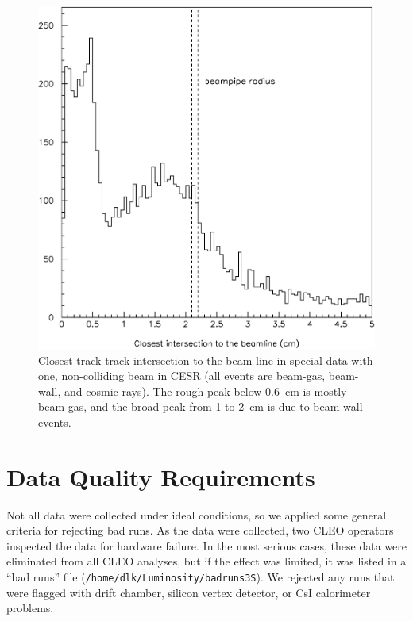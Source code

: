 \documentclass{cornell}
\begin{document}
\begin{figure}[p]
  \begin{center}
    \includegraphics[width=\linewidth]{plots/smallbeamwall}
  \end{center}
  \caption{\label{smallbeamwall} Closest track-track intersection to
  the beam-line in special data with one, non-colliding beam in CESR
  (all events are beam-gas, beam-wall, and cosmic rays).  The rough
  peak below 0.6~cm is mostly beam-gas, and the broad peak from 1 to
  2~cm is due to beam-wall events.}
\end{figure}

\section{Data Quality Requirements}
\label{sec:quality}

Not all data were collected under ideal conditions, so we applied some
general criteria for rejecting bad runs.  As the data were collected,
two CLEO operators inspected the data for hardware failure.  In the
most serious cases, these data were eliminated from all CLEO analyses,
but if the effect was limited, it was listed in a ``bad runs'' file
({\tt /home/dlk/Luminosity/badruns3S}).  We rejected any runs that
were flagged with drift chamber, silicon vertex detector, or CsI
calorimeter problems.
\end{document}
